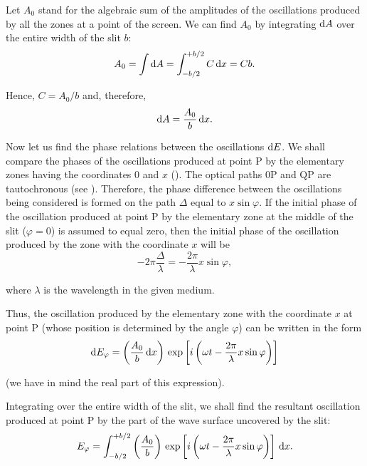 Let $A_0$ stand for the algebraic sum of the amplitudes of the oscillations produced by all the zones at a point of the screen.
We can find $A_0$ by integrating $\mathrm{d} A$ over the entire width of the slit $b$:
\begin{equation*}
	A_0 = \int \mathrm{d} A = \int^{+b/2}_{-b/2} C\, \mathrm{d} x = C b.
\end{equation*}

\noindent
Hence, $C=A_0/b$ and, therefore,
\begin{equation*}
	\mathrm{d} A = \frac{A_0}{b}\, \mathrm{d} x.
\end{equation*}

Now let us find the phase relations between the oscillations $\mathrm{d} E$.
We shall compare the phases of the oscillations produced at point P by the elementary zones having the coordinates $0$ and $x$ ().
The optical paths $0$P and QP are tautochronous (see ).
Therefore, the phase difference between the oscillations being considered is formed on the path $\Delta$ equal to $x\sin\varphi$.
If the initial phase of the oscillation produced at point P by the elementary zone at the middle of the slit ($\varphi=0$) is assumed to equal zero, then the initial phase of the oscillation produced by the zone with the coordinate $x$ will be
\begin{equation*}
	-2 \pi \frac{\Delta}{\lambda} = - \frac{2\pi}{\lambda} x \sin\varphi,
\end{equation*}

\noindent
where $\lambda$ is the wavelength in the given medium.

Thus, the oscillation produced by the elementary zone with the coordinate $x$ at point P (whose position is determined by the angle $\varphi$) can be written in the form
\begin{equation}\label{eq:18_21}
	\mathrm{d} E_{\varphi} = \left(\frac{A_0}{b}\, \mathrm{d} x\right)\, \exp\left[ i \left( \omega t - \frac{2\pi}{\lambda} x \sin\varphi \right) \right]
\end{equation}

\noindent
(we have in mind the real part of this expression).

Integrating  over the entire width of the slit, we shall find the resultant oscillation produced at point P by the part of the wave surface uncovered by the slit:
\begin{equation*}
	E_{\varphi} = \int^{+b/2}_{-b/2} \left( \frac{A_0}{b} \right)\, \exp\left[ i \left( \omega t - \frac{2\pi}{\lambda} x \sin\varphi \right) \right]\, \mathrm{d} x.
\end{equation*}

